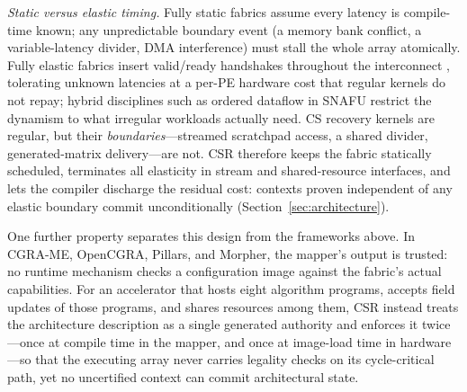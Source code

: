 \emph{Static versus elastic timing.} Fully static fabrics assume every
latency is compile-time known; any unpredictable boundary event (a memory
bank conflict, a variable-latency divider, DMA interference) must stall the
whole array atomically. Fully elastic fabrics insert valid/ready handshakes
throughout the interconnect \cite{strela2024}, tolerating unknown latencies
at a per-PE hardware cost that regular kernels do not repay; hybrid
disciplines such as ordered dataflow in SNAFU \cite{gobieski2021snafu}
restrict the dynamism to what irregular workloads actually need. CS
recovery kernels are regular, but their \emph{boundaries}---streamed
scratchpad access, a shared divider, generated-matrix delivery---are not.
CSR therefore keeps the fabric statically scheduled, terminates all
elasticity in stream and shared-resource interfaces, and lets the compiler
discharge the residual cost: contexts proven independent of any elastic
boundary commit unconditionally (Section~\ref{sec:architecture}).

One further property separates this design from the frameworks above. In
CGRA-ME, OpenCGRA, Pillars, and Morpher, the mapper's output is trusted: no
runtime mechanism checks a configuration image against the fabric's actual
capabilities. For an accelerator that hosts eight algorithm programs,
accepts field updates of those programs, and shares resources among them,
CSR instead treats the architecture description as a single generated
authority and enforces it twice---once at compile time in the mapper, and
once at image-load time in hardware---so that the executing array never
carries legality checks on its cycle-critical path, yet no uncertified
context can commit architectural state.
